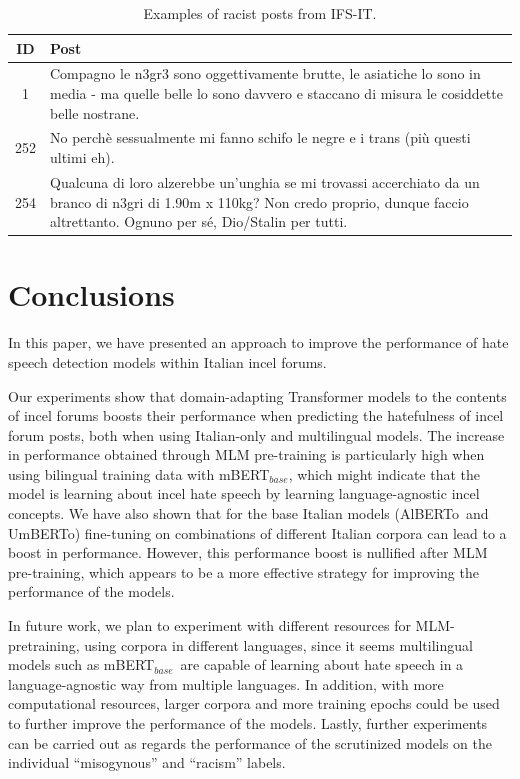 \documentclass[11pt]{article}
\newcommand{\paolo}[1]{{\color{red} #1}}
\newcommand{\dsITclassification}{IFS-IT}
\newcommand{\mbert}{\mbox{mBERT$_{base}$}}
\newcommand{\umbert}{\mbox{UmBERTo}}
\newcommand{\albert}{\mbox{AlBERTo}}
\begin{document}
\begin{table}
  \centering
  \caption{Examples of racist posts from \dsITclassification.}
  \label{tab:examples}
  \begin{tabular}{cp{6cm}}
  \hline
  \bf ID & \bf Post \\
  \hline
  1 & Compagno le n3gr3 sono oggettivamente brutte, le asiatiche lo sono in media - ma quelle belle lo sono davvero e staccano di misura le cosiddette belle nostrane. \\
  \hline
  252 & No perchè sessualmente mi fanno schifo le negre e i trans (più questi ultimi eh). \\
  \hline
  254 & Qualcuna di loro alzerebbe un'unghia se mi trovassi accerchiato da un branco di n3gri di 1.90m x 110kg? Non credo proprio, dunque faccio altrettanto. Ognuno per sé, Dio/Stalin per tutti. \\  
  \hline
  \end{tabular}
\end{table}

\section{Conclusions}

In this paper, we have presented an approach to improve the performance of hate speech detection models within Italian incel forums.

Our experiments show that domain-adapting Transformer models to the contents of incel forums boosts their performance when predicting the hatefulness of incel forum posts, both when using Italian-only and multilingual models. The increase in performance obtained through MLM pre-training is particularly high when using bilingual training data with \mbert, which might indicate that the model is learning about incel hate speech by learning language-agnostic incel concepts.
We have also shown that for the base Italian models (\albert\, and \umbert) fine-tuning on combinations of different Italian corpora can lead to a boost in performance. However, this performance boost is nullified after MLM pre-training, which appears to be a more effective strategy for improving the performance of the models.

In future work, we plan to experiment with different resources for MLM-pretraining, using corpora in different languages, since it seems multilingual models such as \mbert\, are capable of learning about hate speech in a language-agnostic way from multiple languages. In addition, with more computational resources, larger corpora and more training epochs could be used to further improve the performance of the models. \paolo{Lastly, further experiments can be carried out as regards the performance of the scrutinized models on the individual ``misogynous'' and ``racism'' labels.}
\end{document}
